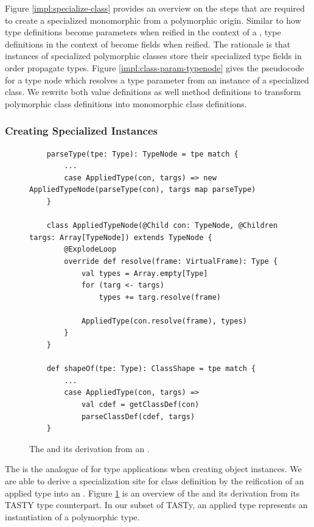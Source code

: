 Figure \ref{impl:specialize-class} provides an overview on the steps that are required to create a specialized monomorphic  from a polymorphic origin.
Similar to how type definitions become parameters when reified in the context of a , type definitions in the context of  become fields when reified.
The rationale is that instances of specialized polymorphic classes store their specialized type fields in order propagate types.
Figure \ref{impl:class-param-typenode} gives the pseudocode for a type node which resolves a type parameter from an instance of a specialized class.
We rewrite both value definitions as well method definitions to transform polymorphic class definitions into monomorphic class definitions.

\subsubsection*{Creating Specialized Instances}

\begin{figure}[!htb]
	\begin{verbatim}
	parseType(tpe: Type): TypeNode = tpe match {
		...
		case AppliedType(con, targs) => new AppliedTypeNode(parseType(con), targs map parseType) 
	}

	class AppliedTypeNode(@Child con: TypeNode, @Children targs: Array[TypeNode]) extends TypeNode {
		@ExplodeLoop
		override def resolve(frame: VirtualFrame): Type {
			val types = Array.empty[Type]
			for (targ <- targs)
				types += targ.resolve(frame)
			
			AppliedType(con.resolve(frame), types)
		}
	}

	def shapeOf(tpe: Type): ClassShape = tpe match {
		...
		case AppliedType(con, targs) => 
			val cdef = getClassDef(con)
			parseClassDef(cdef, targs)
	}
	\end{verbatim}
	\caption{The  and its derivation from an .}
	\label{impl:applied-type-node}
\end{figure}

The  is the analogue of  for type applications when creating object instances.
We are able to derive a specialization site for class definition by the reification of an applied type into an .
Figure \ref{impl:applied-type-node} is an overview of the  and its derivation from its TASTY type counterpart.
In our subset of TASTy, an applied type represents an instantiation of a polymorphic type.

